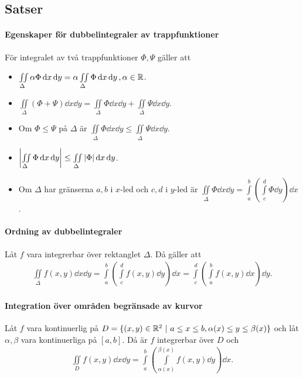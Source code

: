 \subsection{Satser}

\paragraph{Egenskaper för dubbelintegraler av trappfunktioner}
För integralet av två trappfunktioner $\Phi, \Psi$ gäller att
\begin{itemize}
	\item $\iint\limits_{\Delta}\alpha\Phi\dd{x}\dd{y} = \alpha\iint\limits_{\Delta}\Phi\dd{x}\dd{y}, \alpha\in\mathbb{R}$.
	\item $\iint\limits_{\Delta}(\Phi + \Psi)\dd{x}\dd{y} = \iint\limits_{\Delta}\Phi\dd{x}\dd{y} + \iint\limits_{\Delta}\Psi\dd{x}\dd{y}$.
	\item Om $\Phi\leq\Psi$ på $\Delta$ är $\iint\limits_{\Delta}\Phi\dd{x}\dd{y}\leq\iint\limits_{\Delta}\Psi\dd{x}\dd{y}$.
	\item $\abs{\iint\limits_{\Delta}\Phi\dd{x}\dd{y}}\leq\iint\limits_{\Delta}\abs{\Phi}\dd{x}\dd{y}$.
	\item Om $\Delta$ har gränserna $a, b$ i $x$-led och $c, d$ i $y$-led är $\iint\limits_{\Delta}\Phi\dd{x}\dd{y} = \int\limits_{a}^{b}\left(\int\limits_{c}^{d}\Phi\dd{y}\right)\dd{x}$.
\end{itemize}

\proof

\paragraph{Ordning av dubbelintegraler}
Låt $f$ vara integrerbar över rektanglet $\Delta$. Då gäller att
\begin{align*}
	\iint\limits_{\Delta}f(x, y)\dd{x}\dd{y} = \int\limits_{a}^{b}\left(\int\limits_{c}^{d}f(x, y)\dd{y}\right)\dd{x} = \int\limits_{c}^{d}\left(\int\limits_{a}^{b}f(x, y)\dd{x}\right)\dd{y}.
\end{align*}

\proof

\paragraph{Integration över områden begränsade av kurvor}
Låt $f$ vara kontinuerlig på $D = \{(x, y)\in\R^2\ |\ a\leq x\leq b, \alpha(x)\leq y\leq\beta(x)\}$ och låt $\alpha, \beta$ vara kontinuerliga på $[a, b]$. Då är $f$ integrerbar över $D$ och
\begin{align*}
	\iint\limits_{D}f(x, y)\dd{x}\dd{y} = \int\limits_{a}^{b}\left(\int\limits_{\alpha(x)}^{\beta(x)}f(x, y)\dd{y}\right)\dd{x}.
\end{align*}

